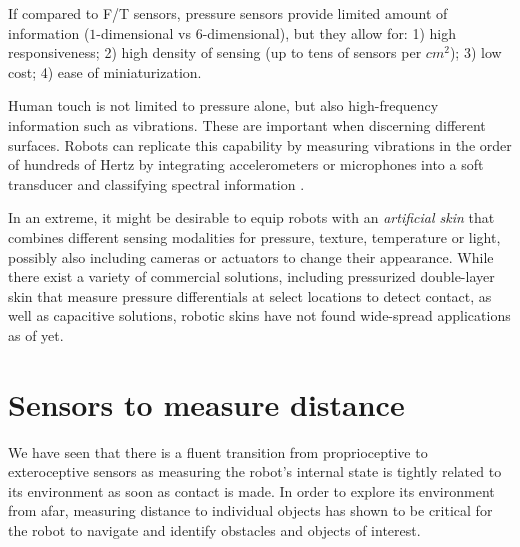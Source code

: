 If compared to F/T sensors, pressure sensors provide limited amount of information ($1$-dimensional vs $6$-dimensional), but they allow for: 1) high responsiveness; 2) high density of sensing (up to tens of sensors per $cm^2$); 3) low cost; 4) ease of miniaturization.

Human touch is not limited to pressure alone, but also high-frequency information such as vibrations. These are important when discerning different surfaces. Robots can replicate this capability by measuring vibrations in the order of hundreds of Hertz by integrating accelerometers or microphones into a soft transducer and classifying spectral information \cite{hughes2015texture}.

In an extreme, it might be desirable to equip robots with an \emph{artificial skin} that combines different sensing modalities for pressure, texture, temperature or light, possibly also including cameras or actuators to change their appearance. While there exist a variety of commercial solutions, including pressurized double-layer skin that measure pressure differentials at select locations to detect contact, as well as capacitive solutions, robotic skins have not found wide-spread applications as of yet.  



\section{Sensors to measure distance}
We have seen that there is a fluent transition from proprioceptive to exteroceptive sensors as measuring the robot's internal state is tightly related to its environment as soon as contact is made. In order to explore its environment from afar, measuring distance to individual objects has shown to be critical for the robot to navigate and identify obstacles and objects of interest. 

